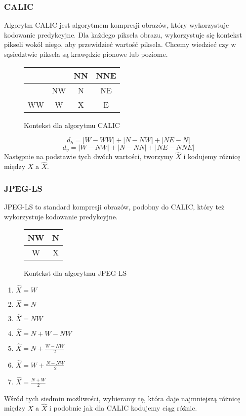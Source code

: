 \documentclass{../notatki}
\begin{document}
\subsubsection{CALIC}

Algorytm CALIC jest algorytmem kompresji obrazów, który wykorzystuje
kodowanie predykcyjne. Dla każdego piksela obrazu, wykorzystuje się kontekst
pikseli wokół niego, aby przewidzieć wartość piksela. Chcemy wiedzieć czy w
sąsiedztwie piksela są krawędzie pionowe lub poziome.
\begin{figure*}[h]
  \centering
  \begin{tabular}{|c|c|c|c|}
    \hline
    & & NN & NNE \\
    \hline
    & NW & N & NE \\
    \hline
    WW & W & \color{red} X & E \\
    \hline
  \end{tabular}
  \caption{Kontekst dla algorytmu CALIC}
\end{figure*}
$$
d_h = |W - WW| + |N - NW| + |NE - N|
$$
$$
d_v = |W - NW| + |N - NN| + |NE - NNE|
$$
Następnie na podstawie tych dwóch wartości, tworzymy $\widehat{X}$ i kodujemy
różnicę między $X$ a $\widehat{X}$.

\subsubsection{JPEG-LS}

JPEG-LS to standard kompresji obrazów, podobny do CALIC, który też
wykorzystuje
kodowanie predykcyjne.
\begin{figure*}[h]
  \centering
  \begin{tabular}{|c|c|}
    \hline
    NW & N \\
    \hline
    W & \color{red} X \\
    \hline
  \end{tabular}
  \caption{Kontekst dla algorytmu JPEG-LS}
\end{figure*}
\begin{enumerate}
  \item $\widehat{X} = W$
  \item $\widehat{X} = N$
  \item $\widehat{X} = NW$
  \item $\widehat{X} = N + W - NW$
  \item $\widehat{X} = N + \frac{W - NW}{2}$
  \item $\widehat{X} = W + \frac{N - NW}{2}$
  \item $\widehat{X} = \frac{N + W}{2}$
\end{enumerate}
Wśród tych siedmiu możliwości, wybieramy tę, która daje najmniejszą różnicę
między $X$ a $\widehat{X}$ i podobnie jak dla CALIC kodujemy ciąg różnic.
\end{document}
